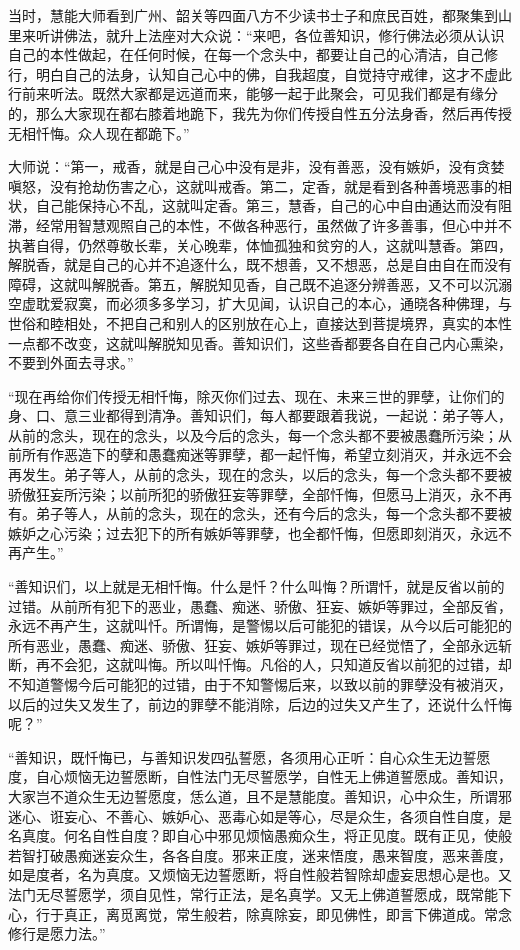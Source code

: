 \documentclass[12pt,twoside,openany]{book}
\newcommand{\kai}[1]{{\CJKfamily{kai}#1}}
\begin{document}
\kai{当时，慧能大师看到广州、韶关等四面八方不少读书士子和庶民百姓，都聚集到山里来听讲佛法，就升上法座对大众说：“来吧，各位善知识，修行佛法必须从认识自己的本性做起，在任何时候，在每一个念头中，都要让自己的心清洁，自己修行，明白自己的法身，认知自己心中的佛，自我超度，自觉持守戒律，这才不虚此行前来听法。既然大家都是远道而来，能够一起于此聚会，可见我们都是有缘分的，那么大家现在都右膝着地跪下，我先为你们传授自性五分法身香，然后再传授无相忏悔。众人现在都跪下。”
	
大师说：“第一，戒香，就是自己心中没有是非，没有善恶，没有嫉妒，没有贪婪嗔怒，没有抢劫伤害之心，这就叫戒香。第二，定香，就是看到各种善境恶事的相状，自己能保持心不乱，这就叫定香。第三，慧香，自己的心中自由通达而没有阻滞，经常用智慧观照自己的本性，不做各种恶行，虽然做了许多善事，但心中并不执著自得，仍然尊敬长辈，关心晚辈，体恤孤独和贫穷的人，这就叫慧香。第四，解脱香，就是自己的心并不追逐什么，既不想善，又不想恶，总是自由自在而没有障碍，这就叫解脱香。第五，解脱知见香，自己既不追逐分辨善恶，又不可以沉溺空虚耽爱寂寞，而必须多多学习，扩大见闻，认识自己的本心，通晓各种佛理，与世俗和睦相处，不把自己和别人的区别放在心上，直接达到菩提境界，真实的本性一点都不改变，这就叫解脱知见香。善知识们，这些香都要各自在自己内心熏染，不要到外面去寻求。”

“现在再给你们传授无相忏悔，除灭你们过去、现在、未来三世的罪孽，让你们的身、口、意三业都得到清净。善知识们，每人都要跟着我说，一起说：弟子等人，从前的念头，现在的念头，以及今后的念头，每一个念头都不要被愚蠢所污染；从前所有作恶造下的孽和愚蠢痴迷等罪孽，都一起忏悔，希望立刻消灭，并永远不会再发生。弟子等人，从前的念头，现在的念头，以后的念头，每一个念头都不要被骄傲狂妄所污染；以前所犯的骄傲狂妄等罪孽，全部忏悔，但愿马上消灭，永不再有。弟子等人，从前的念头，现在的念头，还有今后的念头，每一个念头都不要被嫉妒之心污染；过去犯下的所有嫉妒等罪孽，也全都忏悔，但愿即刻消灭，永远不再产生。”

“善知识们，以上就是无相忏悔。什么是忏？什么叫悔？所谓忏，就是反省以前的过错。从前所有犯下的恶业，愚蠢、痴迷、骄傲、狂妄、嫉妒等罪过，全部反省，永远不再产生，这就叫忏。所谓悔，是警惕以后可能犯的错误，从今以后可能犯的所有恶业，愚蠢、痴迷、骄傲、狂妄、嫉妒等罪过，现在已经觉悟了，全部永远斩断，再不会犯，这就叫悔。所以叫忏悔。凡俗的人，只知道反省以前犯的过错，却不知道警惕今后可能犯的过错，由于不知警惕后来，以致以前的罪孽没有被消灭，以后的过失又发生了，前边的罪孽不能消除，后边的过失又产生了，还说什么忏悔呢？”}

“善知识，既忏悔已，与善知识发四弘誓愿，各须用心正听：自心众生无边誓愿度，自心烦恼无边誓愿断，自性法门无尽誓愿学，自性无上佛道誓愿成。善知识，大家岂不道众生无边誓愿度，恁么道，且不是慧能度。善知识，心中众生，所谓邪迷心、诳妄心、不善心、嫉妒心、恶毒心如是等心，尽是众生，各须自性自度，是名真度。何名自性自度？即自心中邪见烦恼愚痴众生，将正见度。既有正见，使般若智打破愚痴迷妄众生，各各自度。邪来正度，迷来悟度，愚来智度，恶来善度，如是度者，名为真度。又烦恼无边誓愿断，将自性般若智除却虚妄思想心是也。又法门无尽誓愿学，须自见性，常行正法，是名真学。又无上佛道誓愿成，既常能下心，行于真正，离觅离觉，常生般若，除真除妄，即见佛性，即言下佛道成。常念修行是愿力法。”
\end{document}
